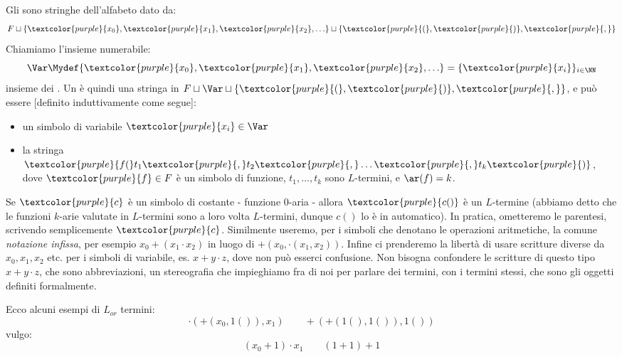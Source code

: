 \begin{definition}
    [$L$-termine]
    Gli  sono stringhe dell'alfabeto dato da:
    \[ F \sqcup \{\textcolor{purple}{x_0},\textcolor{purple}{x_1},\textcolor{purple}{x_2}, \ldots\} \sqcup \{\textcolor{purple}{(}, \textcolor{purple}{)}, \textcolor{purple}{,}\}
    \]
    Chiamiamo l'insieme numerabile:
    \[ \Var \Mydef \{\textcolor{purple}{x_0},\textcolor{purple}{x_1},\textcolor{purple}{x_2}, \ldots\} = \{\textcolor{purple}{x_i}\}_{i \in \NN}
    \]
    insieme dei . Un  è quindi una stringa in $F \sqcup \Var \sqcup \{\textcolor{purple}{(}, \textcolor{purple}{)}, \textcolor{purple}{,}\}$, e può essere [definito induttivamente come segue]:
    \begin{itemize}
        \item un simbolo di variabile $\textcolor{purple}{x_i} \in \Var$
        \item la stringa $\textcolor{purple}{f(}t_1\textcolor{purple}{,}t_2\textcolor{purple}{,} \ldots\textcolor{purple}{,} t_k\textcolor{purple}{)}$, dove $\textcolor{purple}{f} \in F$ è un simbolo di funzione, $t_1,\ldots,t_k$ sono $L$-termini, e $\ar(f) = k$.
    \end{itemize}
\end{definition}

\begin{remark}
    Se $\textcolor{purple}{c}$ è un simbolo di costante - funzione 0-aria - allora $\textcolor{purple}{c()}$ è un $L$-termine (abbiamo detto che le funzioni $k$-arie valutate in $L$-termini sono a loro volta $L$-termini, dunque $c()$ lo è in automatico).
    In pratica, ometteremo le parentesi, scrivendo semplicemente $\textcolor{purple}{c}$.
    Similmente useremo, per i simboli che denotano le operazioni aritmetiche, la comune \emph{notazione infissa}, per esempio $x_0 + (x_1 \cdot x_2)$ in luogo di $+(x_0, \cdot(x_1,x_2))$.
    Infine ci prenderemo la libertà di usare scritture diverse da $x_0,x_1,x_2$ etc. per i simboli di variabile, es. $x+y\cdot z$, dove non può esserci confusione.
    Non bisogna confondere le scritture di questo tipo $x+y\cdot z$, che sono abbreviazioni, un stereografia che impieghiamo fra di noi per parlare dei termini, con i termini stessi, che sono gli oggetti definiti formalmente.
\end{remark}

\begin{example}
    Ecco alcuni esempi di $L_{or}$ termini:
    \[ \cdot(+(x_0,1()),x_1) \qquad +(+(1(),1()),1())
    \]
    vulgo:
    \[ (x_0 + 1) \cdot x_1 \qquad (1 + 1) + 1
    \]
\end{example}

